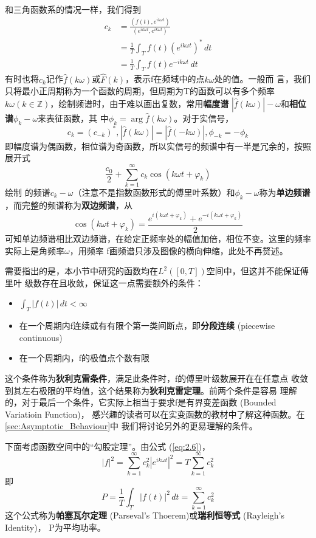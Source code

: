 \documentclass{ctexbook}
\begin{document}
和三角函数系的情况一样，我们得到
\begin{align*}
    c_k & =\frac{(f(t),e^{ik\omega t})}{(e^{ik\omega t},e^{ik\omega t})} \\
        & =\frac{1}{T}\int_{T}f(t)(e^{ik\omega t})^*\,dt                 \\
        & =\frac{1}{T}\int_{T}f(t)e^{-ik\omega t}\,dt
\end{align*}
有时也将$c_k$记作$\hat{f}(k\omega)$或$\hat{F}(k)$，表示f在频域中的点$k\omega$处的值。一般而
言，我们只将最小正周期称为一个函数的周期，但周期为T的函数可以有多个频率
$k\omega(k \in \mathbb{Z})$，绘制频谱时，由于难以画出复数，常用\textbf{幅度谱}
$|\hat{f}(k\omega)|-\omega$和\textbf{相位谱}$\phi_k-\omega$来表征函数，其
中$\phi_k=\arg\hat{f}(k\omega)$。对于实信号，
\[c_k=(c_{-k})^*,|\hat{f}(k\omega)|=|\hat{f}(-k\omega)|,\phi_{-k}=-\phi_k\]
即幅度谱为偶函数，相位谱为奇函数，所以实信号的频谱中有一半是冗余的，按照展开式
\[\frac{c_0}{2}+\sum_{k = 1}^{\infty} c_k\cos(k\omega t+\varphi _k)\]绘制
的频谱$c_k-\omega$（注意不是指数函数形式的傅里叶系数）和$\phi_k-\omega$称为\textbf{单边频谱}
，而完整的频谱称为\textbf{双边频谱}，从
\[\cos(k\omega t+\varphi _k)=\frac{e^{i(k\omega t+\varphi_k)}+e^{-i(k\omega t+\varphi_k)}}{2}\]
可知单边频谱相比双边频谱，在给定正频率处的幅值加倍，相位不变。这里的频率实际上是角频率$\omega$，用频率
f画频谱只涉及图像的横向伸缩，此处不再赘述。

需要指出的是，本小节中研究的函数均在$L^2([0,T])$空间中，但这并不能保证傅里叶
级数存在且收敛，保证这一点需要额外的条件：
\begin{itemize}[nosep, left=0pt]
    \item $\int_{T}|f(t)|\,dt<\infty$
    \item 在一个周期内f连续或有有限个第一类间断点，即\textbf{分段连续} (piecewise continuous)
    \item 在一个周期内，f的极值点个数有限
\end{itemize}
这个条件称为\textbf{狄利克雷条件}，满足此条件时，f的傅里叶级数展开在在任意点
收敛到其左右极限的平均值，这个结果称为\textbf{狄利克雷定理}。前两个条件是容易
理解的，对于最后一个条件，它实际上相当于要求f是有界变差函数 (Bounded Variatioin Function)，
感兴趣的读者可以在实变函数的教材中了解这种函数。在\ref{sec:Asymptotic_Behaviour}中
我们将讨论另外的更易理解的条件。

下面考虑函数空间中的“勾股定理”。由公式 (\ref{eq:2.6})，
\[|f|^2=\sum_{k=1}^{\infty}c_k^2|e^{ik\omega t}|^2=T\sum_{k=1}^{\infty}c_k^2\]
即\[P=\frac{1}{T}\int_{T}|f(t)|^2\,dt=\sum_{k=1}^{\infty}c_k^2\]
这个公式称为\textbf{帕塞瓦尔定理} (Parseval's Thoerem)或\textbf{瑞利恒等式} (Rayleigh's Identity)，
P为平均功率。
\end{document}
